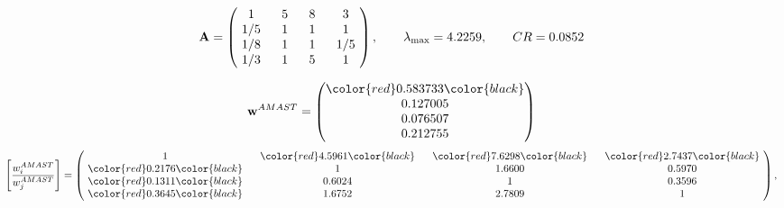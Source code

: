 \begin{example}
\begin{equation*}
\mathbf{A} =
\begin{pmatrix}
$\,\,$ 1 $\,\,$ & $\,\,$5$\,\,$ & $\,\,$8$\,\,$ & $\,\,$3 $\,\,$ \\
$\,\,$ 1/5$\,\,$ & $\,\,$ 1 $\,\,$ & $\,\,$1$\,\,$ & $\,\,$1 $\,\,$ \\
$\,\,$ 1/8$\,\,$ & $\,\,$ 1 $\,\,$ & $\,\,$ 1 $\,\,$ & $\,\,$ 1/5 $\,\,$ \\
$\,\,$ 1/3$\,\,$ & $\,\,$ 1 $\,\,$ & $\,\,$5$\,\,$ & $\,\,$ 1  $\,\,$ \\
\end{pmatrix},
\qquad
\lambda_{\max} =
4.2259,
\qquad
CR = 0.0852
\end{equation*}

\begin{equation*}
\mathbf{w}^{AMAST} =
\begin{pmatrix}
\color{red} 0.583733\color{black} \\
0.127005\\
0.076507\\
0.212755
\end{pmatrix}\end{equation*}
\begin{equation*}
\left[ \frac{{w}^{AMAST}_i}{{w}^{AMAST}_j} \right] =
\begin{pmatrix}
$\,\,$ 1 $\,\,$ & $\,\,$\color{red} 4.5961\color{black} $\,\,$ & $\,\,$\color{red} 7.6298\color{black} $\,\,$ & $\,\,$\color{red} 2.7437\color{black} $\,\,$ \\
$\,\,$\color{red} 0.2176\color{black} $\,\,$ & $\,\,$ 1 $\,\,$ & $\,\,$1.6600$\,\,$ & $\,\,$0.5970  $\,\,$ \\
$\,\,$\color{red} 0.1311\color{black} $\,\,$ & $\,\,$0.6024$\,\,$ & $\,\,$ 1 $\,\,$ & $\,\,$0.3596 $\,\,$ \\
$\,\,$\color{red} 0.3645\color{black} $\,\,$ & $\,\,$1.6752$\,\,$ & $\,\,$2.7809$\,\,$ & $\,\,$ 1  $\,\,$ \\
\end{pmatrix},
\end{equation*}


\end{example}
